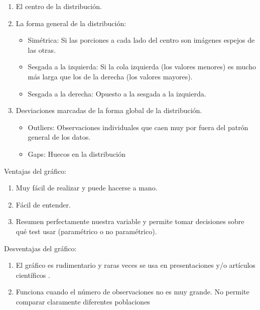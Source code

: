 \documentclass[
]{book}
\providecommand{\tightlist}{%
  \setlength{\itemsep}{0pt}\setlength{\parskip}{0pt}}
\begin{document}
\begin{enumerate}
\def\labelenumi{\arabic{enumi}.}
\tightlist
\item
  El centro de la distribución.
\item
  La forma general de la distribución:

  \begin{itemize}
  \tightlist
  \item
    Simétrica: Si las porciones a cada lado del centro son imágenes espejos de las otras.
  \item
    Sesgada a la izquierda: Si la cola izquierda (los valores menores) es mucho más larga que los de la derecha (los valores mayores).
  \item
    Sesgada a la derecha: Opuesto a la sesgada a la izquierda.
  \end{itemize}
\item
  Desviaciones marcadas de la forma global de la distribución.

  \begin{itemize}
  \tightlist
  \item
    Outliers: Observaciones individuales que caen muy por fuera del patrón general de los datos.
  \item
    Gaps: Huecos en la distribución
  \end{itemize}
\end{enumerate}

Ventajas del gráfico:

\begin{enumerate}
\def\labelenumi{\arabic{enumi}.}
\tightlist
\item
  Muy fácil de realizar y puede hacerse a mano.
\item
  Fácil de entender.
\item
  Resumen perfectamente nuestra variable y permite tomar decisiones sobre qué test usar (paramétrico o no paramétrico).
\end{enumerate}

Desventajas del gráfico:

\begin{enumerate}
\def\labelenumi{\arabic{enumi}.}
\setcounter{enumi}{1}
\tightlist
\item
  El gráfico es rudimentario y raras veces se usa en presentaciones y/o artículos científicos .
\item
  Funciona cuando el número de observaciones no es muy grande.
  No permite comparar claramente diferentes poblaciones
\end{enumerate}
\end{document}

